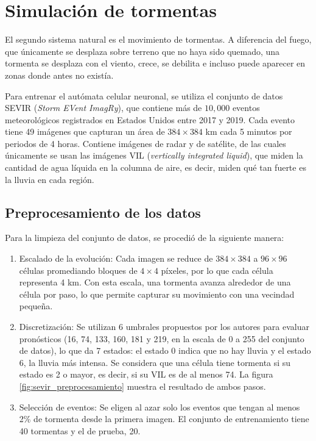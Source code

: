 \section{Simulación de tormentas}

El segundo sistema natural es el movimiento de tormentas. A diferencia del fuego, que únicamente se desplaza sobre terreno que no haya sido quemado, una tormenta se desplaza con el viento, crece, se debilita e incluso puede aparecer en zonas donde antes no existía.

Para entrenar el autómata celular neuronal, se utiliza el conjunto de datos SEVIR (\textit{Storm EVent ImagRy}), que contiene más de $10{,}000$ eventos meteorológicos registrados en Estados Unidos entre 2017 y 2019. Cada evento tiene 49 imágenes que capturan un área de $384 \times 384$ km cada 5 minutos por periodos de 4 horas. Contiene imágenes de radar y de satélite, de las cuales únicamente se usan las imágenes VIL (\textit{vertically integrated liquid}), que miden la cantidad de agua líquida en la columna de aire, es decir, miden qué tan fuerte es la lluvia en cada región.

\subsection{Preprocesamiento de los datos}

Para la limpieza del conjunto de datos, se procedió de la siguiente manera:

\begin{enumerate}
	\item Escalado de la evolución: Cada imagen se reduce de $384 \times 384$ a $96 \times 96$ células promediando bloques de $4 \times 4$ píxeles, por lo que cada célula representa 4 km. Con esta escala, una tormenta avanza alrededor de una célula por paso, lo que permite capturar su movimiento con una vecindad pequeña.

	\item Discretización: Se utilizan 6 umbrales propuestos por los autores para evaluar pronósticos (16, 74, 133, 160, 181 y 219, en la escala de 0 a 255 del conjunto de datos), lo que da 7 estados: el estado 0 indica que no hay lluvia y el estado 6, la lluvia más intensa. Se considera que una célula tiene tormenta si su estado es 2 o mayor, es decir, si su VIL es de al menos 74. La figura \ref{fig:sevir_preprocesamiento} muestra el resultado de ambos pasos.

	\item Selección de eventos: Se eligen al azar solo los eventos que tengan al menos 2\% de tormenta desde la primera imagen. El conjunto de entrenamiento tiene 40 tormentas y el de prueba, 20.
\end{enumerate}

